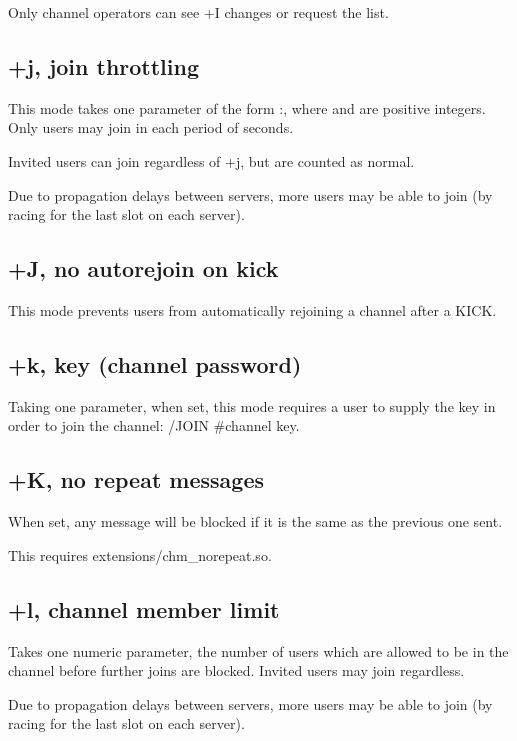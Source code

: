 	Only channel operators can see +I changes or request the list.


\subsection{+j, join throttling}

	This mode takes one parameter of the form
	:, where  and
	 are positive integers. Only  users may
	join in each period of  seconds.


	Invited users can join regardless of +j, but are counted as normal.


	Due to propagation delays between servers, more users may be
	able to join (by racing for the last slot on each server).


\subsection{+J, no autorejoin on kick}

	This mode prevents users from automatically rejoining a channel after a
	KICK.


\subsection{+k, key (channel password)}

	Taking one parameter, when set, this mode requires a user to supply the
	key in order to join the channel: /JOIN \#channel key.


\subsection{+K, no repeat messages}

	When set, any  message will be blocked if it is the same as the
	previous one sent.


	This requires extensions/chm\_norepeat.so.


\subsection{+l, channel member limit}

	Takes one numeric parameter, the number of users which are allowed to
	be in the channel before further joins are blocked. Invited users may
	join regardless.

	Due to propagation delays between servers, more users may be able to
	join (by racing for the last slot on each server).


